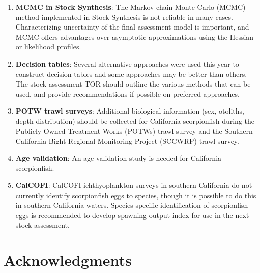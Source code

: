 \documentclass[12pt,]{article}
\begin{document}
\begin{enumerate}
\item \textbf{MCMC in Stock Synthesis}: The Markov chain Monte Carlo (MCMC) 
method implemented in Stock Synthesis is not reliable in many cases.  
Characterizing uncertainty of the final assessment model is important, and 
MCMC offers advantages over asymptotic approximations using the Hessian or 
likelihood profiles. 

\item \textbf{Decision tables}: Several alternative approaches were used this 
year to construct decision tables and some approaches may be better than others. 
The stock assessment TOR should outline the various methods that can be used, 
and provide recommendations if possible on preferred approaches.


\item \textbf{POTW trawl surveys}: Additional biological information 
(sex, otoliths, depth distribution) should be collected for California 
scorpionfish during the Publicly Owned Treatment Works (POTWs) trawl 
survey and the Southern California Bight Regional Monitoring Project 
(SCCWRP) trawl survey.

\item \textbf{Age validation}: An age validation study is needed for 
California scorpionfish.


\item \textbf{CalCOFI}: CalCOFI ichthyoplankton surveys in southern California 
do not currently identify scorpionfish eggs to species, though it is possible to 
do this in southern California waters. Species-specific identification of 
scorpionfish eggs is recommended to develop spawning output index for use in 
the next stock assessment.



\end{enumerate}

\section{Acknowledgments}\label{acknowledgments}
\end{document}
